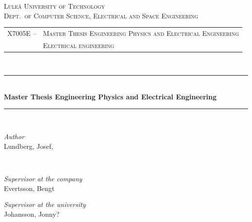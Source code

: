 \newcommand{\HRule}{\rule{\linewidth}{0.5mm}}
\center %


\textsc{\LARGE Luleå University of Technology}\\[1.5cm] %

\textsc{\Large Dept.\ of Computer Science, Electrical and Space Engineering}\\[0.5cm] %

\begin{centering}
\begin{tabular}{l l}
\textsc{\large X7005E --}	& \textsc{\large Master Thesis Engineering Physics and Electrical Engineering}\\ %
				& \textsc{\large Electrical engineering} %
\end{tabular}
\end{centering}\\[0.5cm]

\HRule\\[0.8cm]

{\huge\bfseries Master Thesis Engineering Physics and Electrical Engineering \project}\\[0.4cm] %

\HRule\\[1.5cm]

\begin{minipage}{0.4\textwidth}
	\begin{flushleft}
		\large
		\emph{Author}\\
		Lundberg, Josef, \\ 
	\end{flushleft}
\end{minipage}
~
\begin{minipage}{0.4\textwidth}
	\begin{flushright}
		\large
		\textit{Supervisor at the company}\\
		Evertsson, Bengt
	\end{flushright}
	\begin{flushright}
		\large
		\textit{Supervisor at the university}\\
		Johansson, Jonny?
	\end{flushright}
\end{minipage}

